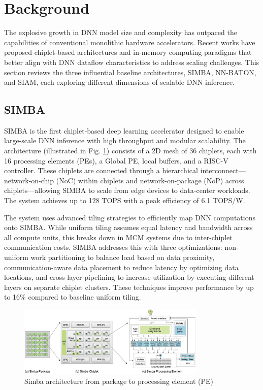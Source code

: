 \documentclass[acmsmall]{acmart}
\begin{document}
\section{Background}


The explosive growth in DNN model size and complexity has outpaced the capabilities of conventional monolithic hardware accelerators. Recent works have proposed chiplet-based architectures and in-memory computing paradigms that better align with DNN dataflow characteristics to address scaling challenges. This section reviews the three influential baseline architectures, SIMBA, NN-BATON, and SIAM, each exploring different dimensions of scalable DNN inference.
\subsection{SIMBA}

SIMBA  is the first chiplet-based deep learning accelerator designed to enable large-scale DNN inference with high throughput and modular scalability. The architecture (illustrated in Fig. \ref{fig:simbaArchitecture}) consists of a 2D mesh of 36 chiplets, each with 16 processing elements (PEs), a Global PE, local buffers, and a RISC-V controller. These chiplets are connected through a hierarchical interconnect—network-on-chip (NoC) within chiplets and network-on-package (NoP) across chiplets—allowing SIMBA to scale from edge devices to data-center workloads. The system achieves up to 128 TOPS with a peak efficiency of 6.1 TOPS/W.

The system uses advanced tiling strategies to efficiently map DNN computations onto SIMBA. While uniform tiling assumes equal latency and bandwidth across all compute units, this breaks down in MCM systems due to inter-chiplet communication costs. SIMBA addresses this with three optimizations: non-uniform work partitioning to balance load based on data proximity, communication-aware data placement to reduce latency by optimizing data locations, and cross-layer pipelining to increase utilization by executing different layers on separate chiplet clusters. These techniques improve performance by up to 16\% compared to baseline uniform tiling.

\begin{figure}[h]
  \centering
  \includegraphics[width=0.8\textwidth]{figures/simbaArchitecture.png}
  \caption{Simba architecture from package to processing element (PE) \cite{Simba}}
  \label{fig:simbaArchitecture}
  
\end{figure}
\end{document}
